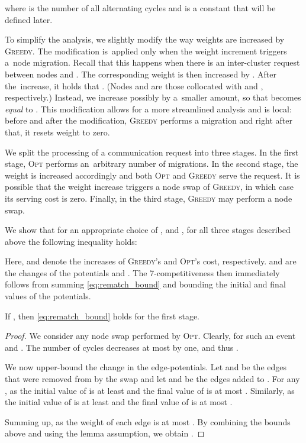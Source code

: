 \documentclass{siamart190516}
\newcommand{\GREEDY}{\textsc{Greedy}\xspace}
\newcommand{\OPT}{\textsc{Opt}\xspace}
\begin{document}
where  is the number of all alternating cycles and  is a constant that will
be defined later.

To simplify the analysis, we slightly modify the way weights are increased by
\GREEDY. The modification is~applied only when the weight increment triggers 
a~node migration. Recall that this happens when there is an inter-cluster
request between nodes  and . The corresponding weight  is then
increased by . After the~increase, it holds that . (Nodes  and  are those collocated with  and ,
respectively.) Instead, we increase  possibly by a~smaller amount, so
that  becomes \emph{equal} to . This
modification allows for a more streamlined analysis and is local: before and
after the modification, \GREEDY performs a migration and right after that, 
it resets weight  to zero.

We split the processing of a communication request  into three stages. In
the first stage, \OPT performs an~arbitrary number of migrations. In the
second stage, the weight  is increased accordingly and both \OPT and
\GREEDY serve the request. It is possible that the weight increase triggers a
node swap of \GREEDY, in which case its serving cost is zero. Finally, in the
third stage, \GREEDY may perform a node swap.

We show that for an appropriate choice of ,  and , for all
three stages described above the following inequality holds:

Here,  and  denote the increases of \GREEDY's and
\OPT's cost, respectively.  and  are the changes
of the potentials  and . The 7-competitiveness then immediately
follows from summing \eqref{eq:rematch_bound} and bounding the initial and
final values of the potentials. 

\begin{lemma}
\label{lem:opt_swap}
If , then \eqref{eq:rematch_bound}
holds for the first stage.
\end{lemma}

\begin{proof}
We consider any node swap performed by \OPT. Clearly, for such an event
 and . The number of cycles
decreases at most by one, and thus .

We now upper-bound the change in the edge-potentials. Let  and
 be the edges that were removed from  by the swap and let
 and  be the edges added to . For any ,  as the initial value of
 is at least  and the final value of  is at
most . Similarly,  as the
initial value of  is at least  and the final value
of  is at most .

Summing up,  as the weight of each edge
is at most . By combining the bounds above and using the
lemma assumption, we obtain .
\end{proof}
\end{document}
